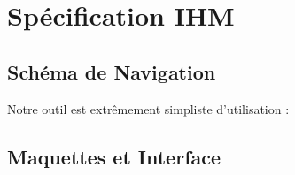 \documentclass[a4paper, 12pt, twoside]{article}
\begin{document}
\section{Spécification IHM}
\subsection{Schéma de Navigation}

Notre outil est extrêmement simpliste d'utilisation  :
\begin{figure}[!h]
\caption{}
\end{figure}






\newpage
\subsection{Maquettes et Interface}
\begin{figure}[!h]
\caption{}
\end{figure}
\begin{figure}[!h]
\caption{}
\end{figure}
\end{document}
